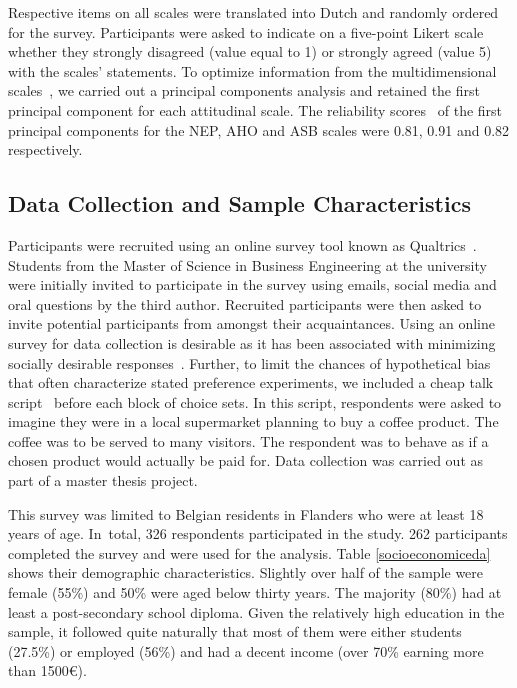 \documentclass[sustainability,article,accept,moreauthors,pdftex,10pt,a4paper]{Definitions/mdpi}
\theoremstyle{mdpi}
\newcounter{ex}
\newcounter{re}
\theoremstyle{mdpidefinition}
\begin{document}
\par{Respective items on all scales were translated into Dutch and randomly ordered for the survey. Participants were asked to indicate on a five-point Likert scale whether they strongly disagreed (value equal to 1) or strongly agreed (value 5) with the scales' statements. \iffalse Respondents' internal consistency for the attitudes was tested using Cronbach's Alpha~\cite{Tavakol2011}. Internal consistencies for NEP, AHO and ASB scales were 0.75, 0.87 and 0.72 respectively. The internal consistencies suggest using a single value for each scale. \fi To optimize information from the multidimensional scales~\cite{Fitalew2018}, we carried out a principal components analysis and retained the first principal component for each attitudinal scale. The reliability scores~\cite{Werts1974, lattin2003} of the first principal components for the NEP, AHO and ASB scales were 0.81, 0.91 and 0.82 respectively.

\subsection{Data Collection and Sample Characteristics}
\par{Participants were recruited using an online survey tool known as Qualtrics~\cite{Qualtrics2018}. Students from the Master of Science in Business Engineering at the university were initially invited to participate in the survey using emails, social media and oral questions by the third author.  Recruited participants were then asked to invite potential participants from amongst their acquaintances. Using an online survey for data collection is desirable as it has been associated with minimizing socially desirable responses~\cite{Kreuter2008}. Further, to limit the chances of hypothetical bias that often characterize stated preference experiments, we included a cheap talk script~\cite{Cummings1999,VanLoo2011} before each block of choice sets. In this script, respondents were asked to imagine they were in a local supermarket planning to buy a coffee product. The coffee was to be served to many visitors. The respondent was to behave as if a chosen product would actually be paid for. Data collection was carried out as part of a master thesis project. }

\par{This survey was limited to Belgian residents in Flanders who were at least 18 years of age. In~total, 326 respondents participated in the study. 262 participants completed the survey and were used for the analysis. Table \ref{socioeconomiceda} shows their demographic characteristics. Slightly over half of the sample were female (55\%) and 50\% were aged below thirty years. The majority (80\%) had at least a post-secondary school diploma. Given the relatively high education in the sample, it followed quite naturally that most of them were either students (27.5\%) or employed (56\%) and had a decent income (over 70\% earning more than 1500\euro).}

}
\end{document}
